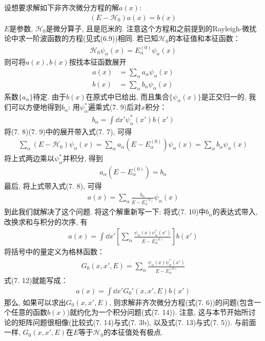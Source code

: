 设想要求解如下非齐次微分方程的解$a(x)$:
\begin{align}
(E - \mathscr{H}_0)a(x) = b(x)
\end{align}
$E$是参数, $\mathscr{H}_0$是微分算子, 且是厄米的. 注意这个方程和之前提到的Rayleigh-\sch 微扰论中求一阶波函数的方程(见式(6.9))相同. 若已知$\mathscr{H}_0$的本征值和本征函数：
\begin{align}
\mathscr{H}_0\psi_\alpha(x) = E_\alpha^{(0)} \psi_\alpha(x)
\end{align}
则可将$a(x),b(x)$按找本征函数展开
\begin{align}
a(x) & = \sum_\alpha a_\alpha \psi_\alpha(x)\\
b(x) & = \sum_\alpha b_\alpha \psi_\alpha(x)
\end{align}
系数$\{ a_\alpha \}$待定. 
由于$b(x)$在原式中已给出, 
而且集合$\{ \psi_\alpha(x)\}$是正交归一的, 
我们可以方便地得到$b_\alpha$: 用$\psi_\alpha^*$遍乘式(7.
9)后对$x$积分：
\begin{align}
b_\alpha = \int\dd x'\psi_\alpha^*(x')b(x')
\end{align}
将(7.
8)(7.
9)中的展开带入式(7.
7), 
可得
\begin{align*}
\sum_\alpha (E - \mathscr{H}_0)\psi_\alpha(x) = \sum_\alpha a_\alpha (E - E_\alpha^{(0)}) \psi_\alpha(x) = \sum_\alpha b_\alpha\psi_\alpha(x)
\end{align*}
将上式两边乘以$\psi_\alpha^*$并积分, 
得到
\begin{align*}
a_\alpha (E - E_\alpha^{(0)}) = b_{\alpha}
\end{align*}
最后, 
将上式带入式(7.
8), 
可得
\begin{align}
a(x) = \sum_\alpha \frac{b_{\alpha}}{E - E_\alpha^{(0)}} \psi_\alpha(x)
\end{align}
到此我们就解决了这个问题. 
将这个解重新写一下: 将式(7.
10)中$b_\alpha$的表达式带入, 
改换求和与积分的次序, 
有
\begin{align}
a(x) = \int\dd x'\left[ \sum_\alpha \frac{\psi_\alpha(x)\psi_\alpha^*(x')}{E - E_\alpha^{(0)}} \right] b(x')
\end{align}
将括号中的量定义为格林函数：
\begin{align}
G_0 (x,x',E) = \sum_\alpha \frac{\psi_\alpha(x)\psi_\alpha^*(x')}{E - E_\alpha^{(0)}}
\end{align}
式(7.
12)就能写成：
\begin{align}
a(x) = \int\dd x' G_0'(x,x',E)b(x')
\end{align}
那么, 
如果可以求出$G_0(x,x',E)$, 
则求解非齐次微分方程(式(7.
6))的问题(包含一个任意的函数$b(x)$)就约化为一个积分问题(式(7.
14)). 
注意, 
这与本节开始所讨论的矩阵问题很相像(比较式(7.
14)与式(7.
3b), 
以及式(7.
13)与式(7.
5)). 
与前面一样, 
$G_0(x,x',E)$在$E$等于$\mathscr{H}_0$的本征值处有极点.


